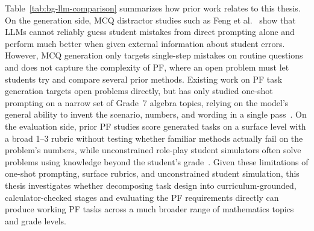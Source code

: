 Table~\ref{tab:bg-llm-comparison} summarizes how prior work relates to this thesis. On the generation side, MCQ distractor studies such as Feng et al.~\cite{feng2024} show that LLMs cannot reliably guess student mistakes from direct prompting alone and perform much better when given external information about student errors. However, MCQ generation only targets single-step mistakes on routine questions and does not capture the complexity of PF, where an open problem must let students try and compare several prior methods. Existing work on PF task generation targets open problems directly, but has only studied one-shot prompting on a narrow set of Grade~7 algebra topics, relying on the model's general ability to invent the scenario, numbers, and wording in a single pass~\cite{rahimi2025productivemath,rahimi2025}. On the evaluation side, prior PF studies score generated tasks on a surface level with a broad 1--3 rubric without testing whether familiar methods actually fail on the problem's numbers, while unconstrained role-play student simulators often solve problems using knowledge beyond the student's grade~\cite{liu2023novice,srivatsa2025abilities}. Given these limitations of one-shot prompting, surface rubrics, and unconstrained student simulation, this thesis investigates whether decomposing task design into curriculum-grounded, calculator-checked stages and evaluating the PF requirements directly can produce working PF tasks across a much broader range of mathematics topics and grade levels.
